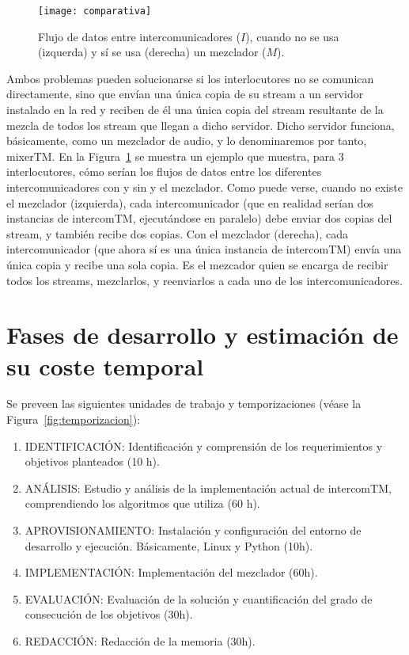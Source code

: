\documentclass[titlepage, 12pt, a4paper, oneside]{article}
\begin{document}
\begin{figure}
  \begin{center}
    \texttt{[image: comparativa]}
  \end{center}
  \caption{Flujo de datos entre intercomunicadores ($I$), cuando no se
    usa (izquerda) y sí se usa (derecha) un mezclador ($M$).}
  \label{fig:comparativa}
\end{figure}

Ambos problemas pueden solucionarse si los interlocutores no se
comunican directamente, sino que envían una única copia de su stream a
un servidor instalado en la red y reciben de él una única copia del
stream resultante de la mezcla de todos los stream que llegan a dicho
servidor. Dicho servidor funciona, básicamente, como un mezclador de
audio, y lo denominaremos por tanto, mixerTM. En la
Figura~\ref{fig:comparativa} se muestra un ejemplo que muestra, para 3
interlocutores, cómo serían los flujos de datos entre los diferentes
intercomunicadores con y sin y el mezclador. Como puede verse, cuando
no existe el mezclador (izquierda), cada intercomunicador (que en
realidad serían dos instancias de intercomTM, ejecutándose en
paralelo) debe enviar dos copias del stream, y también recibe dos
copias. Con el mezclador (derecha), cada intercomunicador (que ahora
sí es una única instancia de intercomTM) envía una única copia y
recibe una sola copia. Es el mezcador quien se encarga de recibir
todos los streams, mezclarlos, y reenviarlos a cada uno de los
intercomunicadores.

\section{Fases de desarrollo y estimación de su coste temporal}
\label{sec:fases}
Se preveen las siguientes unidades de trabajo y temporizaciones (véase
la Figura~\ref{fig:temporizacion}):
\begin{enumerate}
  \item {IDENTIFICACIÓN}: Identificación y comprensión de los
    requerimientos y objetivos planteados (10 h).
  \item {ANÁLISIS:} Estudio y análisis de la implementación actual de
    intercomTM, comprendiendo los algoritmos que utiliza (60 h).
  \item {APROVISIONAMIENTO}: Instalación y configuración del entorno
    de desarrollo y ejecución. Básicamente, Linux y Python (10h).
  \item {IMPLEMENTACIÓN}: Implementación del mezclador (60h).
  \item {EVALUACIÓN}: Evaluación de la solución y cuantificación del
    grado de consecución de los objetivos (30h).
  \item {REDACCIÓN}: Redacción de la memoria (30h).
\end{enumerate}
\end{document}
